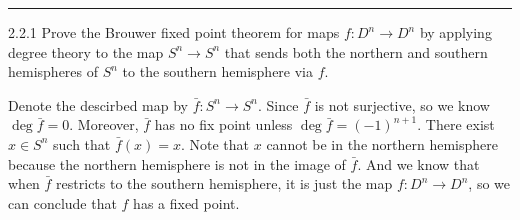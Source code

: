 \documentclass[a4paper, 12pt]{article}
\begin{document}
\noindent\rule{7in}{2.8pt}
\begin{problem}{2.2.1}
Prove the Brouwer fixed point theorem for maps \(f:D^n\rightarrow D^n\) by applying degree theory to the map \(S^n\rightarrow S^n\) that sends both the northern and southern hemispheres 
of \(S^n\) to the southern hemisphere via \(f\). 	
\end{problem}
\begin{solution}
Denote the descirbed map by \(\bar{f}:S^n\rightarrow S^n\). Since \(\bar{f}\) is not surjective, so we know \(\deg \bar{f}=0\). Moreover, \(\bar{f}\) has no fix point unless \(\deg \bar{f}=(-1)^{n+1}\). There 
exist \(x\in S^n\) such that \(\bar{f}(x)=x\). Note that \(x\) cannot be in the northern hemisphere because the northern hemisphere is not in the image of \(\bar{f}\). And we know that when \(\bar{f}\) restricts to the southern hemisphere, 
it is just the map \(f:D^n\rightarrow D^n\), so we can conclude that \(f\) has a fixed point. 
\end{solution}
\end{document}
